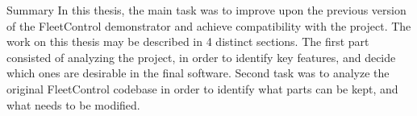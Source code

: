 \chap Summary
In this thesis, the main task was to improve upon the previous version of the FleetControl demonstrator and achieve compatibility with the {\mapfIR} project. 
The work on this thesis may be described in 4 distinct sections.\br
The first part consisted of analyzing the {\mapfIR} project, in order to identify key features, and decide which ones are desirable in the final software.
\br
Second task was to analyze the original FleetControl codebase in order to identify what parts can be kept, and what needs to be modified.
\br
 